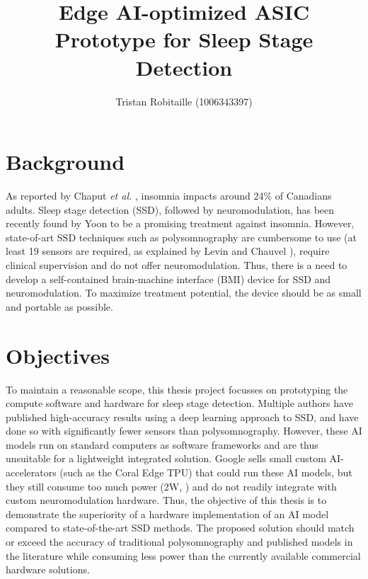 \documentclass[12pt]{article}
\title{Edge AI-optimized ASIC Prototype for Sleep Stage Detection}
\author{Tristan Robitaille (1006343397)}
\date{}
\begin{document}
\maketitle

\thispagestyle{fancy}

\section{Background}
As reported by Chaput \textit{et al.} \cite{insomnia_prevalence}, insomnia impacts around 24\% of Canadians adults. Sleep stage detection (SSD), followed by neuromodulation, has been recently found by Yoon \cite{yoon2021neuromodulation} to be a promising
treatment against insomnia. However, state-of-art SSD techniques such as polysomnography are cumbersome to use (at least 19 sensors are required, as explained by Levin and Chauvel \cite{RUNDO2019381}), require clinical supervision and do not offer neuromodulation.
Thus, there is a need to develop a self-contained brain-machine interface (BMI) device for SSD and neuromodulation. To maximize treatment potential, the device should be as small and portable as possible.

\section{Objectives}
To maintain a reasonable scope, this thesis project focusses on prototyping the compute software and hardware for sleep stage detection. Multiple authors \cite{dutt2023sleepxai, fu2021deep, eldele2021attention} have published high-accuracy results using a deep learning approach to SSD, and have done so with significantly fewer sensors 
than polysomnography. However, these AI models run on standard computers as software frameworks and are thus unsuitable for a lightweight integrated solution. Google sells small custom AI-accelerators (such as the Coral Edge TPU) that could run these AI models, but they still consume too much power (2W, \cite{coral_datasheet}) and do not readily integrate with
custom neuromodulation hardware.
Thus, the objective of this thesis is to demonstrate the superiority of a hardware implementation of an AI model compared to state-of-the-art SSD methods. The proposed solution should match or exceed the accuracy of traditional polysomnography and published models in the literature while consuming less power than the currently available commercial hardware solutions.
\end{document}
